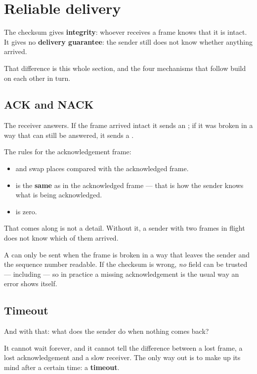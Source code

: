 \section{Reliable delivery}
\label{sec:reliability}

The checksum gives \textbf{integrity}: whoever receives a frame knows that it is intact. It gives
no \textbf{delivery guarantee}: the sender still does not know whether anything arrived.

That difference is this whole section, and the four mechanisms that follow build on each other in
turn.

\subsection{ACK and NACK}

The receiver answers. If the frame arrived intact it sends an ; if it was broken in a
way that can still be answered, it sends a .

The rules for the acknowledgement frame:

\begin{itemize}
  \item {} and  swap places compared with the acknowledged frame.
  \item {} is the \textbf{same} as in the acknowledged frame --- that is how the sender
    knows what is being acknowledged.
  \item {} is zero.
\end{itemize}

That  comes along is not a detail. Without it, a sender with two frames in flight does
not know which of them arrived.

\begin{aside}
\note A  can only be sent when the frame is broken in a way that leaves the sender and
the sequence number readable. If the checksum is wrong, \emph{no} field can be trusted ---
including  --- so in practice a missing acknowledgement is the usual way an error shows
itself.
\end{aside}

\subsection{Timeout}

And with that: what does the sender do when nothing comes back?

It cannot wait forever, and it cannot tell the difference between a lost frame, a lost
acknowledgement and a slow receiver. The only way out is to make up its mind after a certain
time: a \textbf{timeout}.

